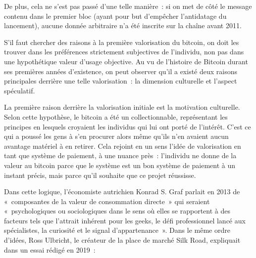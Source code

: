 De plus, cela ne s'est pas passé d'une telle manière~: si on met de côté le message contenu dans le premier bloc (ayant pour but d'empêcher l'antidatage du lancement), aucune donnée arbitraire n'a été inscrite sur la chaîne avant 2011.


S'il faut chercher des raisons à la première valorisation du bitcoin, on doit les trouver dans les préférences strictement subjectives de l'individu, non pas dans une hypothétique valeur d'usage objective. Au vu de l'histoire de Bitcoin durant ses premières années d'existence, on peut observer qu'il a existé deux raisons principales derrière une telle valorisation~: la dimension culturelle et l'aspect spéculatif.

La première raison derrière la valorisation initiale est la motivation culturelle. Selon cette hypothèse, le bitcoin a été un collectionnable, représentant les principes en lesquels croyaient les individus qui lui ont porté de l'intérêt. C'est ce qui a poussé les gens à s'en procurer alors même qu'ils n'en avaient aucun avantage matériel à en retirer. Cela rejoint en un sens l'idée de valorisation en tant que système de paiement, à une nuance près~: l'individu ne donne de la valeur au bitcoin parce que le système est un bon système de paiement à un instant précis, mais parce qu'il souhaite que ce projet réussisse.

Dans cette logique, l'économiste autrichien Konrad S. Graf parlait en 2013 de «~composantes de la valeur de consommation directe~» qui seraient «~psychologiques ou sociologiques dans le sens où elles se rapportent à des facteurs tels que l'attrait inhérent pour les geeks, le défi professionnel lancé aux spécialistes, la curiosité et le signal d'appartenance~». Dans le même ordre d'idées, Ross Ulbricht, le créateur de la place de marché Silk Road, expliquait dans un essai rédigé en 2019~:

